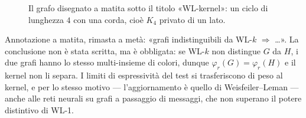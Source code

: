 \begin{figure}[H]
  \centering
  
  \caption{Il grafo disegnato a matita sotto il titolo «WL-kernel»: un ciclo di lunghezza
  $4$ con una corda, cioè $K_4$ privato di un lato.}
  \label{fig:wl-kernel-diamante}
\end{figure}

\begin{osservazione}
  Annotazione a matita, rimasta a metà: «grafi indistinguibili da WL-$k$
  $\Longrightarrow$ \dots». La conclusione non è stata scritta, ma è obbligata: se
  WL-$k$ non distingue $G$ da $H$, i due grafi hanno lo stesso multi-insieme di colori,
  dunque $\varphi_r(G) = \varphi_r(H)$ e il kernel non li separa. I limiti di
  espressività del test si trasferiscono di peso al kernel, e per lo stesso motivo ---
  l'aggiornamento è quello di Weisfeiler--Leman --- anche alle reti neurali su grafi a
  passaggio di messaggi, che non superano il potere distintivo di WL-1.
\end{osservazione}

